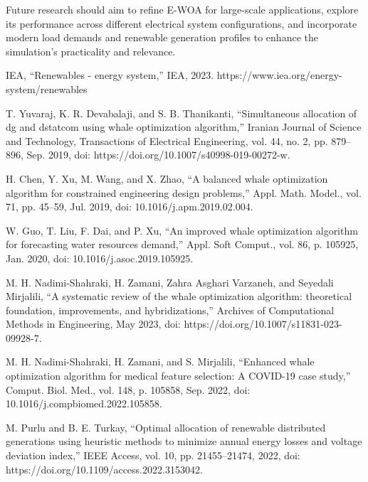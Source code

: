 \documentclass[conference]{IEEEtran}
\begin{document}
Future research should aim to refine E-WOA for large-scale applications, explore its performance across different electrical system configurations, and incorporate modern load demands and renewable generation profiles to enhance the simulation's practicality and relevance.



\begin{thebibliography}{00}

 IEA, “Renewables - energy system,” IEA, 2023. https://www.iea.org/energy-system/renewables

 T. Yuvaraj, K. R. Devabalaji, and S. B. Thanikanti, “Simultaneous allocation of dg and dstatcom using whale optimization algorithm,” Iranian Journal of Science and Technology, Transactions of Electrical Engineering, vol. 44, no. 2, pp. 879–896, Sep. 2019, doi: https://doi.org/10.1007/s40998-019-00272-w.

 H. Chen, Y. Xu, M. Wang, and X. Zhao, “A balanced whale optimization algorithm for constrained engineering design problems,” Appl. Math. Model., vol. 71, pp. 45–59, Jul. 2019, doi: 10.1016/j.apm.2019.02.004.

 	W. Guo, T. Liu, F. Dai, and P. Xu, “An improved whale optimization algorithm for forecasting water resources demand,” Appl. Soft Comput., vol. 86, p. 105925, Jan. 2020, doi: 10.1016/j.asoc.2019.105925.

 M. H. Nadimi-Shahraki, H. Zamani, Zahra Asghari Varzaneh, and Seyedali Mirjalili, “A systematic review of the whale optimization algorithm: theoretical foundation, improvements, and hybridizations,” Archives of Computational Methods in Engineering, May 2023, doi: https://doi.org/10.1007/s11831-023-09928-7.

 M. H. Nadimi-Shahraki, H. Zamani, and S. Mirjalili, “Enhanced whale optimization algorithm for medical feature selection: A COVID-19 case study,” Comput. Biol. Med., vol. 148, p. 105858, Sep. 2022, doi: 10.1016/j.compbiomed.2022.105858.

 M. Purlu and B. E. Turkay, “Optimal allocation of renewable distributed generations using heuristic methods to minimize annual energy losses and voltage deviation index,” IEEE Access, vol. 10, pp. 21455–21474, 2022, doi: https://doi.org/10.1109/access.2022.3153042.




\end{thebibliography}
\end{document}
